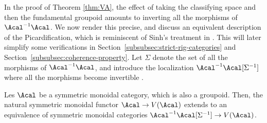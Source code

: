 In the proof of Theorem \ref{thm:VA}, the effect of taking the classifying space and then the fundamental groupoid amounts to inverting all the morphisms of $\Acal^{-1}\Acal$. We now render this precise, and discuss an equivalent description of the Picardification, which is reminiscent of Sinh's treatment in \cite[Chap.\,III]{Sinh-these}. This will later simplify some verifications in Section~\ref{subsubsec:strict-rig-categories} and Section~\ref{subsubsec:coherence-property}. Let $\Sigma$ denote the set of all the morphisms of $\Acal^{-1}\Acal$, and introduce the localization $\Acal^{-1}\Acal[\Sigma^{-1}]$ where all the morphisms become invertible \cite[Chap.\,I]{Gabriel-Zisman}.
\begin{lemma}\label{lemma:VA-tilde}
Les $\Acal$ be a symmetric monoidal category, which is also a groupoid. Then, the natural symmetric monoidal functor $\Acal\to V(\Acal)$ extends to an equivalence of symmetric monoidal categories $\Acal^{-1}\Acal[\Sigma^{-1}]\to V(\Acal)$.
\end{lemma}
